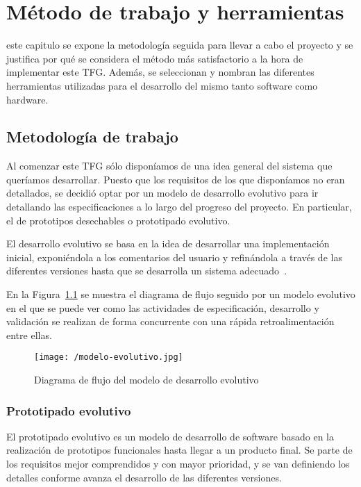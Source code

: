 \chapter{Método de trabajo y herramientas}
\label{chap:metodo}

 este capitulo se expone la metodología seguida para llevar a cabo el proyecto y se
justifica por qué se considera el método más satisfactorio a la hora de implementar este
\acs{TFG}. Además, se seleccionan y nombran las diferentes herramientas utilizadas para el
desarrollo del mismo tanto software como hardware.

\section{Metodología de trabajo}
\label{sec:metodologia}

Al comenzar este \acs{TFG} sólo disponíamos de una idea general del sistema que queríamos
desarrollar. Puesto que los requisitos de los que disponíamos no eran detallados, se decidió optar
por un modelo de desarrollo evolutivo para ir detallando las especificaciones a lo largo del
progreso del proyecto. En particular, el de prototipos desechables o prototipado evolutivo.

El desarrollo evolutivo se basa en la idea de desarrollar una implementación inicial, exponiéndola a
los comentarios del usuario y refinándola a través de las diferentes versiones hasta que se
desarrolla un sistema adecuado~\cite{Sommerville14}.

En la Figura~\ref{fig:modelo-evolutivo} se muestra el diagrama de flujo seguido por un modelo
evolutivo en el que se puede ver como las actividades de especificación, desarrollo y validación se
realizan de forma concurrente con una rápida retroalimentación entre ellas.

\begin{figure}[!h]
  \begin{center}
    \texttt{[image: /modelo-evolutivo.jpg]}
    \caption{Diagrama de flujo del modelo de desarrollo evolutivo}
    \label{fig:modelo-evolutivo}
  \end{center}
\end{figure}

\subsection{Prototipado evolutivo}

El prototipado evolutivo es un modelo de desarrollo de software basado en la realización de
prototipos funcionales hasta llegar a un producto final. Se parte de los requisitos mejor
comprendidos y con mayor prioridad, y se van definiendo los detalles conforme avanza el desarrollo
de las diferentes versiones.

